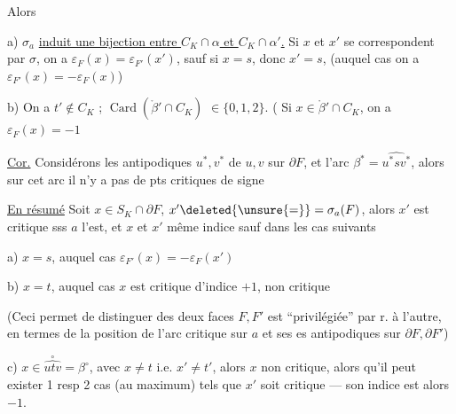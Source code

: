 Alors

a)  $\sigma_a$ \uline{induit une bijection entre $C_K\cap\alpha$ et $C_K\cap\alpha'$.}  Si $x$ et $x'$ se correspondent par $\sigma$, on a $\varepsilon_F(x)=\varepsilon_{F'}(x')$, sauf si $x=s$, donc $x'=s$, (auquel cas on a $\varepsilon_{F'}(x)=-\varepsilon_F(x)$)

b) On a $t'\notin C_K$ ;   $\operatorname{Card}(\mathring{\beta}'\cap C_K)$  $\in\{0,1,2\}$. (   Si $x\in\mathring{\beta}'\cap C_K$, on a $\varepsilon_F(x)=-1$

\uline{Cor.} Considérons les antipodiques $u^*,v^*$ de $u,v$ sur $\partial F$, et l'arc $\beta^*=\widehat{u^*sv^*}$,  alors sur cet arc il n'y a pas de pts critiques de signe 

\uline{En résumé} \quad Soit $x\in S_K\cap\partial F$,  $x'\deleted{\unsure{=}}=\sigma_a(F)$, alors $x'$ est critique sss $a$ l'est, et $x$ et $x'$  même indice sauf dans les cas suivants

a) $x=s$, auquel cas $\varepsilon_{F'}(x)=-\varepsilon_F(x')$

b) $x=t$, auquel cas  $x$ est critique d'indice $+1$,  non critique

(Ceci permet de distinguer   des deux faces $F,F'$ est ``privilégiée'' par r. à l'autre, en termes de la position de l'arc critique  sur $a$ et ses es antipodiques sur $\partial F,\partial F'$)

c) $x\in\overset{\circ}{\widehat{utv}}=\beta^\circ$, avec $x\ne t$ i.e. $x'\ne t'$, alors $x$ non critique, alors qu'il peut exister 1 resp 2 cas (au maximum) tels que $x'$ soit critique --- son indice est alors $-1$.

